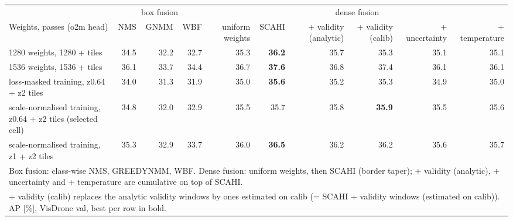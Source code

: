 \begin{tabular}{lrrrrrrrrr}
\toprule
 & \multicolumn{3}{c}{box fusion} & \multicolumn{6}{c}{dense fusion} \\ \cmidrule(lr){2-4}\cmidrule(lr){5-10}
Weights, passes (o2m head) & NMS & GNMM & WBF & uniform weights & SCAHI & + validity (analytic) & + validity (calib) & + uncertainty & + temperature \\
\midrule
1280 weights, 1280 + tiles & 34.5 & 32.2 & 32.7 & 35.3 & \textbf{36.2} & 35.7 & 35.3 & 35.1 & 35.1 \\
1536 weights, 1536 + tiles & 36.1 & 33.7 & 34.4 & 36.7 & \textbf{37.6} & 36.8 & 37.4 & 36.1 & 36.1 \\
loss-masked training, z0.64 + z2 tiles & 34.0 & 31.3 & 31.9 & 35.0 & \textbf{35.6} & 35.2 & 35.3 & 34.9 & 35.0 \\
scale-normalised training, z0.64 + z2 tiles (selected cell) & 34.8 & 32.0 & 32.9 & 35.5 & 35.7 & 35.8 & \textbf{35.9} & 35.5 & 35.6 \\
scale-normalised training, z1 + z2 tiles & 35.3 & 32.9 & 33.7 & 36.0 & \textbf{36.5} & 36.2 & 36.2 & 35.6 & 35.7 \\
\bottomrule
\multicolumn{10}{l}{\footnotesize Box fusion: class-wise NMS, GREEDYNMM, WBF. Dense fusion: uniform weights, then SCAHI (border taper); + validity (analytic), + uncertainty and + temperature are cumulative on top of SCAHI.} \\
\multicolumn{10}{l}{\footnotesize + validity (calib) replaces the analytic validity windows by ones estimated on calib (= SCAHI + validity windows (estimated on calib)). AP [\%], VisDrone val, best per row in bold.} \\
\end{tabular}
